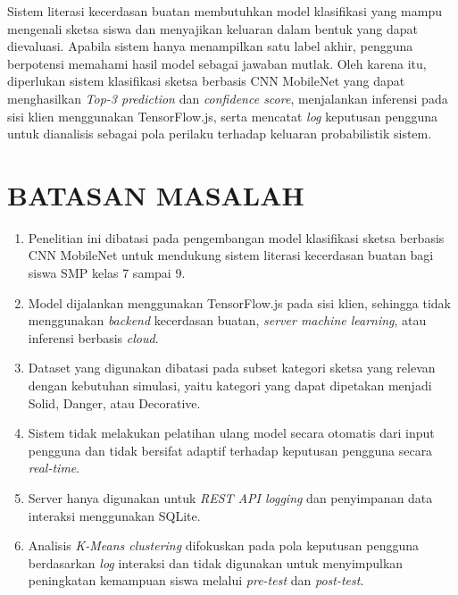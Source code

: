 \documentclass[12pt,a4paper,oneside,openany]{report}
\begin{document}
Sistem literasi kecerdasan buatan membutuhkan model klasifikasi yang mampu mengenali sketsa siswa dan menyajikan keluaran dalam bentuk yang dapat dievaluasi. Apabila sistem hanya menampilkan satu label akhir, pengguna berpotensi memahami hasil model sebagai jawaban mutlak. Oleh karena itu, diperlukan sistem klasifikasi sketsa berbasis CNN MobileNet yang dapat menghasilkan \textit{Top-3 prediction} dan \textit{confidence score}, menjalankan inferensi pada sisi klien menggunakan TensorFlow.js, serta mencatat \textit{log} keputusan pengguna untuk dianalisis sebagai pola perilaku terhadap keluaran probabilistik sistem.

\section{BATASAN MASALAH}
\label{sec:batasan-masalah}

\begin{enumerate}
    \item Penelitian ini dibatasi pada pengembangan model klasifikasi sketsa berbasis CNN MobileNet untuk mendukung sistem literasi kecerdasan buatan bagi siswa SMP kelas 7 sampai 9.
    \item Model dijalankan menggunakan TensorFlow.js pada sisi klien, sehingga tidak menggunakan \textit{backend} kecerdasan buatan, \textit{server machine learning}, atau inferensi berbasis \textit{cloud}.
    \item Dataset yang digunakan dibatasi pada subset kategori sketsa yang relevan dengan kebutuhan simulasi, yaitu kategori yang dapat dipetakan menjadi Solid, Danger, atau Decorative.
    \item Sistem tidak melakukan pelatihan ulang model secara otomatis dari input pengguna dan tidak bersifat adaptif terhadap keputusan pengguna secara \textit{real-time}.
    \item Server hanya digunakan untuk \textit{REST API logging} dan penyimpanan data interaksi menggunakan SQLite.
    \item Analisis \textit{K-Means clustering} difokuskan pada pola keputusan pengguna berdasarkan \textit{log} interaksi dan tidak digunakan untuk menyimpulkan peningkatan kemampuan siswa melalui \textit{pre-test} dan \textit{post-test}.
\end{enumerate}

\end{document}
